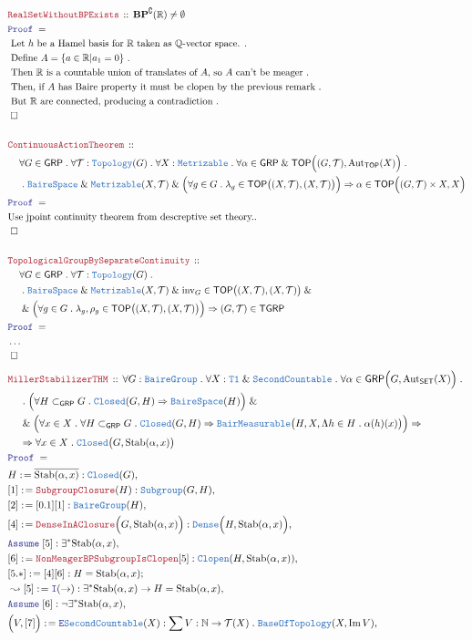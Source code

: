 \documentclass[12pt]{scrartcl}
\newcommand{\TYPE}[1]{\textcolor{NavyBlue}{\mathtt{#1}}}
\newcommand{\LOGIC}[1]{\textcolor{Blue}{\mathtt{#1}}}
\newcommand{\THM}[1]{\textcolor{Maroon}{\mathtt{#1}}}
\renewcommand{\.}{\; . \;}
\newcommand{\de}{: \kern 0.1pc =}
\newcommand{\Theorem}[2]{& \THM{#1} \, :: \, #2 \\ & \Proof = \\ }
\newcommand{\NewLine}{\\ & \kern 1pc}
\newcommand{\Page}[1]{ \begin{align*} #1 \end{align*}   }
\newcommand{\NoProof}{ & \ldots \\ \EndProof}
\newcommand{\Explain}[1]{& \text{#1.} \\}
\renewcommand{\And}{\; \& \;}
\newcommand{\Imply}{\Rightarrow}
\newcommand{\Reals}{\mathbb{R} }
\newcommand{\Rats}{\mathbb{Q} }
\newcommand{\Nat}{\mathbb{N} }
\DeclareMathOperator*{\im}{Im}
\newcommand{\Aut}{\mathrm{Aut}}
\renewcommand{\c}{\complement}
\newcommand{\Say}[3]{& #1 \de #2 : #3, \\}
\newcommand{\Conclude}[3]{& #1 \de #2 : #3; \\}
\newcommand{\Derive}[3]{& \leadsto #1 \de #2 : #3, \\}
\newcommand{\Assume}[2]{& \LOGIC{Assume} \; #1 : #2, \\}
\newcommand{\Intro}{\LOGIC{I}}
\newcommand{\Elim}{\LOGIC{E}}
\newcommand{\QED}{\; \square}
\newcommand{\EndProof}{& \QED \\}
\newcommand{\Proof}{\LOGIC{Proof} \; }
\newcommand{\SET}{\mathsf{SET}}
\newcommand{\Dense}{\TYPE{Dense}}
\newcommand{\Closed}{\TYPE{Closed}}
\newcommand{\Clopen}{\TYPE{Clopen}}
\newcommand{\Bair}{\TYPE{BaireSpace}}
\newcommand{\TOP}{\mathsf{TOP}}
\newcommand{\T}{\mathcal{T}}
\newcommand{\BP}{\mathbf{BP}}
\newcommand{\BM}{\TYPE{BairMeasurable}}
\newcommand{\Sgrp}{\subset_{\mathsf{GRP}}}
\newcommand{\Stab}{\mathrm{Stab}}
\newcommand{\GRP}{\mathsf{GRP}}
\newcommand{\BG}{\TYPE{BaireGroup}}
\newcommand{\inv}{\mathrm{inv}}
\newcommand{\TGRP}{\mathsf{TGRP}}
\begin{document}
\Page{
	\Theorem{RealSetWithoutBPExists}{
		 \BP^\c(\Reals) \neq \emptyset
	}
	\Explain{
		Let $h$ be a Hamel basis for $\Reals$ taken as $\Rats$-vector space.
	}
	\Explain{
		Define $A=\{ a \in \Reals | a_1 = 0 \}$
	}
	\Explain{
		Then $\Reals$ is a countable union of translates of $A$,
		so $A$ can't be meager
	}
	\Explain{
		Then, if $A$ has Baire property it must be clopen by the previous remark
	}
	\Explain{
		But $\Reals$ are connected, producing a contradiction
	}
	\EndProof
	\\
	\Theorem{ContinuousActionTheorem}
	{
		\NewLine 		
		\forall G \in \GRP \.
		\forall \T : \TYPE{Topology}(G) \.
		\forall X : \TYPE{Metrizable} \.
		\forall \alpha \in \GRP \And \TOP\Big( (G,\T), \Aut_\TOP(X) \Big) \. 
		\NewLine \.
		\Bair \And \TYPE{Metrizable}(X,\T) \And 
		\Big( 
			\forall g \in G \. 
			\lambda_g \in \TOP\big( (X,\T), (X,\T)\big) 
		\Big)
		\Imply
		\alpha \in \TOP\Big( (G,\T)\times X, X \Big) 
	}
	\Explain{Use jpoint continuity theorem from descreptive set theory.}
	\EndProof
	\\
	\Theorem{TopologicalGroupBySeparateContinuity}
	{
		\NewLine 		
		\forall G \in \GRP \.
		\forall \T : \TYPE{Topology}(G) \.
		\NewLine \.
		\Bair \And \TYPE{Metrizable}(X,\T) \And
		\inv_G \in   \TOP\big( (X,\T), (X,\T)\big) \And \NewLine \And
		\Big( 
			\forall g \in G \. 
			\lambda_g,\rho_g \in \TOP\big( (X,\T), (X,\T)\big) 
		\Big)
		\Imply
		(G,\T) \in \TGRP
	}
	\NoProof
}\Page{
	\Theorem{MillerStabilizerTHM}
	{
		\forall G : \BG \.
		\forall X : \TYPE{T1} \And \TYPE{SecondCountable} \.
		\forall \alpha \in \GRP\Big( G, \Aut_\SET(X) \Big) \. \NewLine \.
		\Big( \forall H \Sgrp G \. \Closed(G,H) \Imply \Bair(H) \Big)
		\And \NewLine \And
		\Big( \forall x \in X \. \forall H \Sgrp G \.
		\Closed(G,H)  \Imply   \BM\big(H,X,\Lambda h \in H \. \alpha(h)(x)\big) \Big)
		\Imply \NewLine \Imply
		\forall x \in X \. \Closed\big(G, \Stab(\alpha,x) \big)
	}
	\Say{H}{\overline{\Stab(\alpha,x)}}{\Closed(G)}
	\Say{[1]}{\THM{SubgroupClosure}(H)}{\TYPE{Subgroup}(G,H)}
	\Say{[2]}{[0.1][1]}{\BG(H)}
	\Say{[4]}{\THM{DenseInAClosure}\Big(G,\Stab(\alpha,x)\Big)}
	{
		\Dense\Big(H,\Stab(\alpha,x)\Big)
	}
	\Assume{[5]}{\exists^* \Stab(\alpha,x)}
	\Say{[6]}{\THM{NonMeagerBPSubgroupIsClopen}[5]}
	{
		\Clopen(H,\Stab(\alpha,x))
	}
	\Conclude{[5.*]}{[4][6]}{H = \Stab(\alpha,x)}
	\Derive{[5]}{\Intro(\to)}
	{		
		\exists^*\Stab(\alpha,x) \to H = \Stab(\alpha,x)	
	}
	\Assume{[6]}{\neg \exists^* \Stab(\alpha,x)}
	\Say{\Big(V,[7]\Big)}{\Elim \TYPE{SecondCountable}(X)}
	{
		\sum V: \Nat \to \T(X) \.  \TYPE{BaseOfTopology}(X,\im V) 
}}
\end{document}
